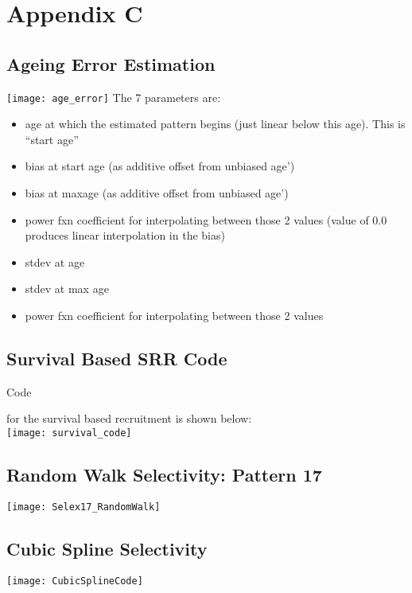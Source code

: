 \section{Appendix C}

\subsection{Ageing Error Estimation}
\hypertarget{AgeingError}{}
\texttt{[image: age\_error]}
The 7 parameters are:

\begin{itemize}
	\item age at which the estimated pattern begins (just linear below this age).  This is “start age”
	\item bias at start age (as additive offset from unbiased age’)
	\item bias at maxage (as additive offset from unbiased age’)
	\item power fxn coefficient for interpolating between those 2 values (value of 0.0 produces linear interpolation in the bias)
	\item stdev at age
	\item stdev at max age
	\item power fxn coefficient for interpolating between those 2 values
\end{itemize}


\subsection{Survival Based SRR Code}
\hypertarget{AppendixC}{Code} for the survival based recruitment is shown below:\\
\texttt{[image: survival\_code]}

\subsection{Random Walk Selectivity: Pattern 17}
\hypertarget{RandWalkSelex}{}
	\begin{center}
		\texttt{[image: Selex17\_RandomWalk]}
		\end{center}

\subsection{Cubic Spline Selectivity}
\hypertarget{CubicSpline}{}
	\begin{center}
		\texttt{[image: CubicSplineCode]}
	\end{center}